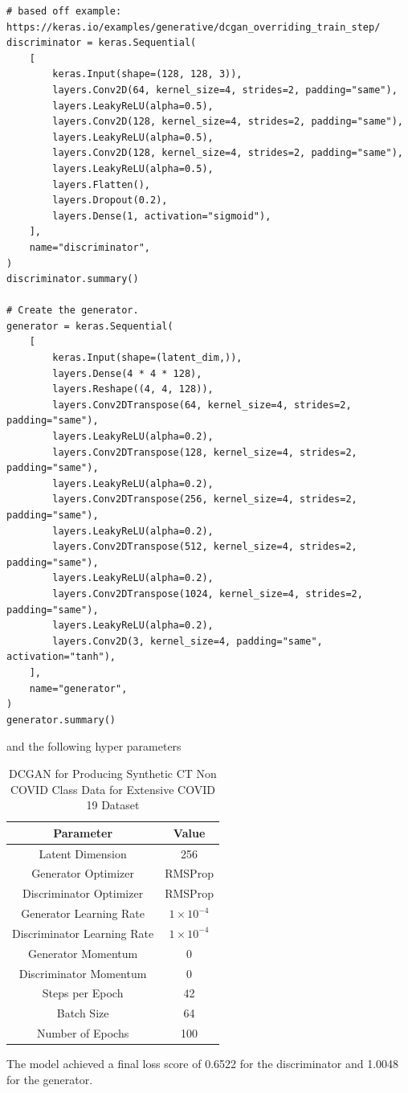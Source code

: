 \begin{verbatim}
# based off example: https://keras.io/examples/generative/dcgan_overriding_train_step/
discriminator = keras.Sequential(
    [
        keras.Input(shape=(128, 128, 3)),
        layers.Conv2D(64, kernel_size=4, strides=2, padding="same"),
        layers.LeakyReLU(alpha=0.5),
        layers.Conv2D(128, kernel_size=4, strides=2, padding="same"),
        layers.LeakyReLU(alpha=0.5),
        layers.Conv2D(128, kernel_size=4, strides=2, padding="same"),
        layers.LeakyReLU(alpha=0.5),
        layers.Flatten(),
        layers.Dropout(0.2),
        layers.Dense(1, activation="sigmoid"),
    ],
    name="discriminator",
)
discriminator.summary()

# Create the generator.
generator = keras.Sequential(
    [
        keras.Input(shape=(latent_dim,)),
        layers.Dense(4 * 4 * 128),
        layers.Reshape((4, 4, 128)),
        layers.Conv2DTranspose(64, kernel_size=4, strides=2, padding="same"),
        layers.LeakyReLU(alpha=0.2),
        layers.Conv2DTranspose(128, kernel_size=4, strides=2, padding="same"),
        layers.LeakyReLU(alpha=0.2),
        layers.Conv2DTranspose(256, kernel_size=4, strides=2, padding="same"),
        layers.LeakyReLU(alpha=0.2),
        layers.Conv2DTranspose(512, kernel_size=4, strides=2, padding="same"),
        layers.LeakyReLU(alpha=0.2),
        layers.Conv2DTranspose(1024, kernel_size=4, strides=2, padding="same"),
        layers.LeakyReLU(alpha=0.2),
        layers.Conv2D(3, kernel_size=4, padding="same", activation="tanh"),
    ],
    name="generator",
)
generator.summary()
\end{verbatim}
and the following hyper parameters 
\begin{table}[H]
    \centering
    \begin{tabular}{|c|c|}
    \hline
        Parameter
        & Value\\
         \hline
          Latent Dimension & 256\\
          Generator Optimizer & RMSProp \\
          Discriminator Optimizer & RMSProp\\
          Generator Learning Rate & $1\times10^{-4}$\\
          Discriminator Learning Rate & $1\times10^{-4}$\\
          Generator Momentum & 0\\
          Discriminator Momentum & 0\\
          Steps per Epoch & 42\\
          Batch Size &  64\\
          Number of Epochs & 100 \\
         \hline
    \end{tabular}
    \caption{DCGAN for Producing Synthetic CT Non COVID Class Data for Extensive COVID 19 Dataset}
    \label{tab:DCGAN for Producing Synthetic CT Non COVID Class Data for Extensive COVID 19 Dataset}
\end{table}
The model achieved a final loss score of 0.6522 for the discriminator and 1.0048 for the generator.
